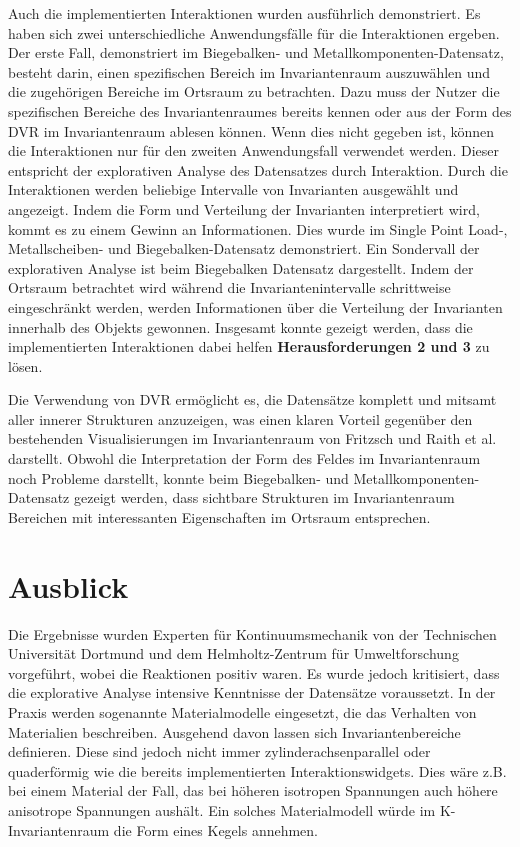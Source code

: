\documentclass[a4paper,fontsize=12pt,toc=bib,parskip=half,ngerman]{scrartcl}
\begin{document}
Auch die implementierten Interaktionen wurden ausf\"uhrlich demonstriert. Es haben sich zwei unterschiedliche Anwendungsf\"alle f\"ur die Interaktionen ergeben. Der erste Fall, demonstriert im Biegebalken- und Metallkomponenten-Datensatz, besteht darin, einen spezifischen Bereich im Invariantenraum auszuw\"ahlen und die zugeh\"origen Bereiche im Ortsraum zu betrachten. Dazu muss der Nutzer die spezifischen Bereiche des Invariantenraumes bereits kennen oder aus der Form des DVR im Invariantenraum ablesen k\"onnen. Wenn dies nicht gegeben ist, k\"onnen die Interaktionen nur f\"ur den zweiten Anwendungsfall verwendet werden. Dieser entspricht der explorativen Analyse des Datensatzes durch Interaktion. Durch die Interaktionen werden beliebige Intervalle von Invarianten ausgew\"ahlt und angezeigt. Indem die Form und Verteilung der Invarianten interpretiert wird, kommt es zu einem Gewinn an Informationen. Dies wurde im Single Point Load-, Metallscheiben- und Biegebalken-Datensatz demonstriert. Ein Sondervall der explorativen Analyse ist beim Biegebalken Datensatz dargestellt. Indem der Ortsraum betrachtet wird w\"ahrend die Invariantenintervalle schrittweise eingeschr\"ankt werden, werden Informationen \"uber die Verteilung der Invarianten innerhalb des Objekts gewonnen. Insgesamt konnte gezeigt werden, dass die implementierten Interaktionen dabei helfen \textbf{Herausforderungen 2 und 3} zu l\"osen.

Die Verwendung von DVR erm\"oglicht es, die Datens\"atze komplett und mitsamt aller innerer Strukturen anzuzeigen, was einen klaren Vorteil gegen\"uber den bestehenden Visualisierungen im Invariantenraum von Fritzsch und Raith et al. darstellt. Obwohl die Interpretation der Form des Feldes im Invariantenraum noch Probleme darstellt, konnte beim Biegebalken- und Metallkomponenten-Datensatz gezeigt werden, dass sichtbare Strukturen im Invariantenraum Bereichen mit interessanten Eigenschaften im Ortsraum entsprechen.

\section{Ausblick}
\label{sec:Ausblick}
Die Ergebnisse wurden Experten f\"ur Kontinuumsmechanik von der Technischen Universit\"at Dortmund und dem Helmholtz-Zentrum f\"ur Umweltforschung vorgef\"uhrt, wobei die Reaktionen positiv waren. Es wurde jedoch kritisiert, dass die explorative Analyse intensive Kenntnisse der Datens\"atze voraussetzt. In der Praxis werden sogenannte Materialmodelle eingesetzt, die das Verhalten von Materialien beschreiben. Ausgehend davon lassen sich Invariantenbereiche definieren. Diese sind jedoch nicht immer zylinderachsenparallel oder quaderf\"ormig wie die bereits implementierten Interaktionswidgets. Dies w\"are z.B. bei einem Material der Fall, das bei h\"oheren isotropen Spannungen auch h\"ohere anisotrope Spannungen aush\"alt. Ein solches Materialmodell w\"urde im K-Invariantenraum die Form eines Kegels annehmen. 
\end{document}
